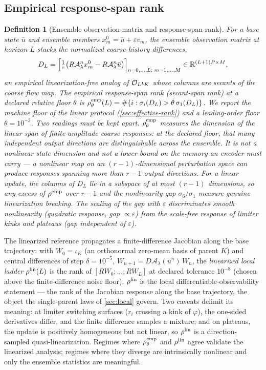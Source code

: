 \documentclass[pdflatex,sn-mathphys-num]{sn-jnl}%
\theoremstyle{thmstyleone}%
\theoremstyle{thmstyletwo}%
\theoremstyle{thmstylethree}%
\newtheorem{definition}{Definition}%
\newcommand{\R}{\mathbb R}
\newcommand{\OL}{{\cal O}_L}
\begin{document}
\subsection{Empirical response-span rank}\label{sec:empirical-rank}

\begin{definition}[Ensemble observation matrix and response-span rank]\label{def:empirical-rank}
For a base state $\bar u$ and ensemble members $x^0_m=\bar u+\varepsilon v_m$, the \emph{ensemble observation matrix} at horizon $L$ stacks the normalized coarse-history differences, \[ D_L=\Bigl[\tfrac1\varepsilon\bigl(R\mathcal A_\lambda^n x^0_m -R\mathcal A_\lambda^n\bar u\bigr)\Bigr]_{n=0,\dots,L;\;m=1,\dots,M} \in\R^{(L+1)P\times M}, \] an empirical linearization-free analog of $\OL\iota_K$ whose columns are secants of the coarse flow map.
The \emph{empirical response-span rank} (secant-span rank) at a declared relative floor $\theta$ is $\rho^{\rm emp}_\theta(L)=\#\{i:\sigma_i(D_L)>\theta\, \sigma_1(D_L)\}$.
We report the machine floor of the linear protocol (\cref{sec:effective-rank}) and a leading-order floor $\theta=10^{-3}$.
Two readings must be kept apart.
$\rho^{\rm emp}_\theta$ measures the dimension of the \emph{linear span of finite-amplitude coarse responses}: at the declared floor, that many independent output directions are distinguishable across the ensemble.
It is \emph{not} a nonlinear state dimension and not a lower bound on the memory an encoder must carry --- a nonlinear map on an $(r-1)$-dimensional perturbation space can produce responses spanning more than $r-1$ output directions.
For a \emph{linear} update, the columns of $D_L$ lie in a subspace of at most $(r-1)$ dimensions, so any excess of $\rho^{\rm emp}$ over $r-1$ and the \emph{nonlinearity gap} $\sigma_6/\sigma_1$ measure genuine linearization breaking.
The scaling of the gap with $\varepsilon$ discriminates smooth nonlinearity (quadratic response, gap $\propto\varepsilon$) from the scale-free response of limiter kinks and plateaus (gap independent of $\varepsilon$).
\end{definition}

The linearized reference propagates a finite-difference Jacobian along the base trajectory: with $W_0=\iota_K$ (an orthonormal zero-mean basis of parent $K$) and central differences of step $\delta=10^{-5}$, $W_{n+1}=D\mathcal A_\lambda(\bar u^n)\,W_n$, the \emph{linearized local ladder} $\rho^{\rm lin}(L)$ is the rank of $[RW_0;\dots;RW_L]$ at declared tolerance $10^{-8}$ (chosen above the finite-difference noise floor).
$\rho^{\rm lin}$ is the local differentiable-observability statement --- the rank of the Jacobian response along the base trajectory, the object the single-parent laws of \cref{sec:local} govern.
Two caveats delimit its meaning: at limiter switching surfaces ($r_i$ crossing a kink of $\varphi$), the one-sided derivatives differ, and the finite difference samples a mixture; and on plateaus, the update is positively homogeneous but not linear, so $\rho^{\rm lin}$ is a direction-sampled quasi-linearization.
Regimes where $\rho^{\rm emp}_\theta$ and $\rho^{\rm lin}$ agree validate the linearized analysis; regimes where they diverge are intrinsically nonlinear and only the ensemble statistics are meaningful.
\end{document}
